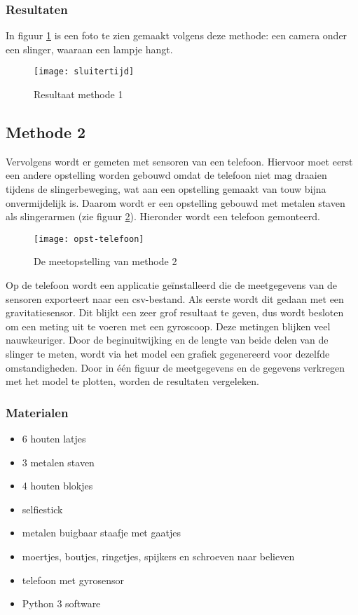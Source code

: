 \documentclass[a4paper]{article}
\begin{document}
	\subsubsection*{Resultaten}
	In figuur \ref{fig:sluiter} is een foto te zien gemaakt volgens deze methode: een camera onder een slinger, waaraan een lampje hangt.
	
	\begin{figure}[!h]
		\centering
		\texttt{[image: sluitertijd]}
		\caption{Resultaat methode 1}
		\label{fig:sluiter}
	\end{figure}
	\FloatBarrier
	
	\subsection{Methode 2}
	\label{met2}
	Vervolgens wordt er gemeten met sensoren van een telefoon. Hiervoor moet eerst een andere opstelling worden gebouwd omdat de telefoon niet mag draaien tijdens de slingerbeweging, wat aan een opstelling gemaakt van touw bijna onvermijdelijk is. Daarom wordt er een opstelling gebouwd met metalen staven als slingerarmen (zie figuur \ref{fig:opst-telefoon}). Hieronder wordt een telefoon gemonteerd.
	\begin{figure}[htb]
		\centering
		\texttt{[image: opst-telefoon]}
		\caption{De meetopstelling van methode 2}
		\label{fig:opst-telefoon}
	\end{figure}
	Op de telefoon wordt een applicatie geïnstalleerd die de meetgegevens van de sensoren exporteert naar een csv-bestand. Als eerste wordt dit gedaan met een gravitatiesensor. Dit blijkt een zeer grof resultaat te geven, dus wordt besloten om een meting uit te voeren met een gyroscoop. Deze metingen blijken veel nauwkeuriger. Door de beginuitwijking en de lengte van beide delen van de slinger te meten, wordt via het model een grafiek gegenereerd voor dezelfde omstandigheden. Door in één figuur de meetgegevens en de gegevens verkregen met het model te plotten, worden de resultaten vergeleken.
	
	\subsubsection*{Materialen}
	\begin{itemize}
		\setlength\itemsep{0em}
		\item 6 houten latjes
		\item 3 metalen staven
		\item 4 houten blokjes
		\item selfiestick
		\item metalen buigbaar staafje met gaatjes
		\item moertjes, boutjes, ringetjes, spijkers en schroeven naar believen
		\item telefoon met gyrosensor
		\item Python 3 software
	\end{itemize}
\end{document}
